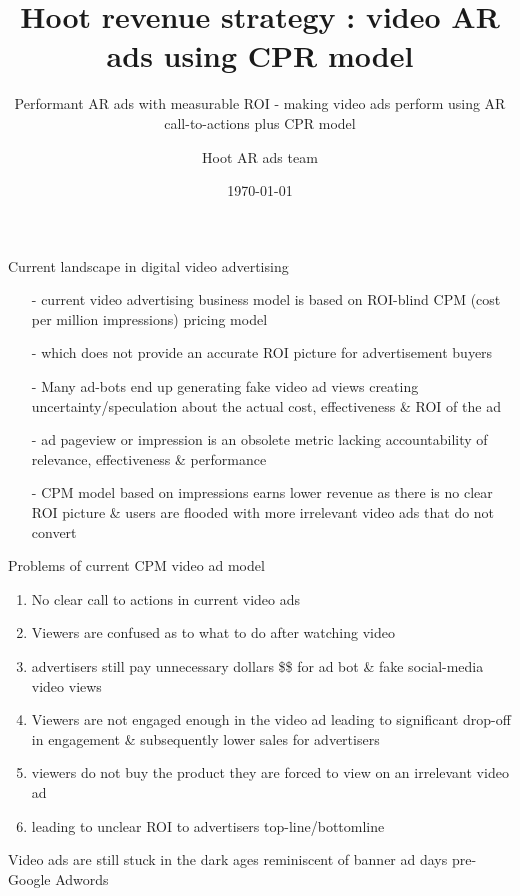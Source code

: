 \documentclass[11pt,handout]{beamer}
\title{ Hoot revenue strategy : video AR ads using CPR model}
\subtitle{Performant AR ads with measurable ROI - making video ads perform using AR call-to-actions plus CPR model}
\date{\today}
\author{Hoot AR ads team}
\institute{Hoot Live inc., a Delaware C-corp}
\begin{document}
\maketitle



\begin{frame}[fragile]{Current landscape in digital video advertising}
 \begin{itemize}[<+-| alert@+>]%
	 
\item[-]current video advertising business model is based on ROI-blind CPM (cost per million impressions) pricing model
\item[-]which does not provide an accurate ROI picture for advertisement buyers
\item[-]Many ad-bots end up generating fake video ad views creating uncertainty/speculation about the actual cost, effectiveness \& ROI of the ad
\item[-]ad pageview or impression is an obsolete metric lacking accountability of relevance, effectiveness \& performance 
\item[-]CPM model based on impressions earns lower revenue as there is no clear ROI picture \& users are flooded with more irrelevant video ads that do not convert
\end{itemize}

\end{frame}
\begin{frame}[t]{Problems of current CPM video ad model}
\begin{enumerate}[<+-| alert@+>]
\item No clear call to actions in current video ads
\item Viewers are confused as to what to do after watching video
\item advertisers still pay unnecessary dollars \$\$ for ad bot \& fake social-media video views
\item Viewers are not engaged enough in the video ad leading to significant drop-off in engagement \& subsequently lower sales for advertisers
\item viewers do not buy the product they are forced to view on an irrelevant video ad
\item leading to unclear ROI to advertisers top-line/bottomline

\end{enumerate}
\pause
Video ads are still stuck in the dark ages reminiscent of banner ad days pre-Google Adwords

\end{frame}
\end{document}
